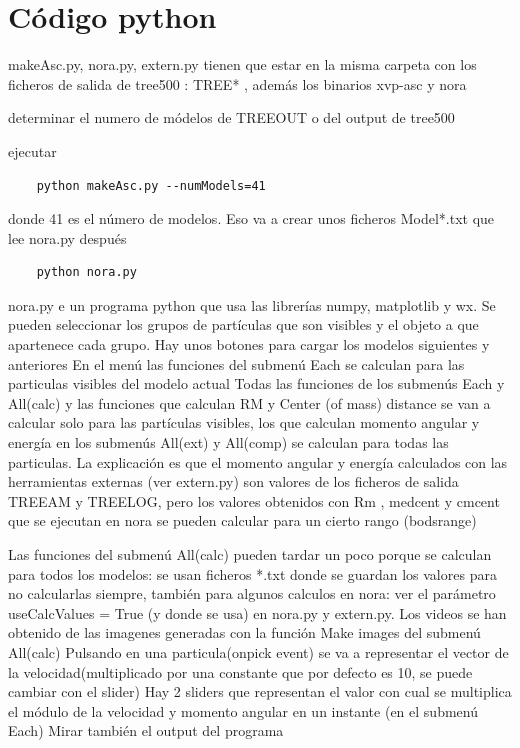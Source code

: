 \documentclass[12pt]{article} %
\renewcommand{\=}[1]{\stackrel{#1}{=}} %
\theoremstyle{definition}
\theoremstyle{remark}
\begin{document}
\section*{Código python}
\begin{description}
\item makeAsc.py, nora.py, extern.py tienen que estar en la misma carpeta con los ficheros de salida de tree500 : TREE* , además los binarios xvp-asc y nora
\item determinar el numero de módelos de TREEOUT o del output de tree500
\item ejecutar 
\begin{verbatim}
	python makeAsc.py --numModels=41
\end{verbatim}
\item donde 41 es el número de modelos. Eso va a crear unos ficheros Model*.txt  que lee nora.py después
\begin{verbatim}
	python nora.py
\end{verbatim}
\item nora.py e un programa python que usa las librerías numpy, matplotlib y wx.
Se pueden seleccionar los grupos de partículas que son visibles y el objeto a que apartenece cada grupo.
Hay unos botones para cargar los modelos siguientes y anteriores  
En el menú las funciones del submenú Each se calculan para las particulas visibles del modelo actual 
Todas las funciones de los submenús  Each y All(calc) y  las funciones que calculan RM y Center (of mass) distance se van a  calcular solo para las partículas visibles, los que calculan momento angular y energía en los submenús All(ext) y All(comp)  se calculan para todas las particulas. 
La explicación es que el momento angular y energía calculados con las herramientas externas (ver extern.py) son valores de los ficheros de salida TREEAM y TREELOG, pero los valores obtenidos con Rm , medcent y cmcent que se ejecutan en nora se pueden calcular para un cierto rango (bodsrange) 

Las funciones del submenú All(calc) pueden tardar un poco porque se calculan para todos los modelos: se usan ficheros *.txt donde se guardan los valores para no calcularlas siempre, también para algunos calculos en nora: ver el parámetro useCalcValues = True  (y donde se usa) en nora.py y extern.py. 
Los videos se han obtenido de las imagenes generadas con la función Make images del submenú All(calc)
Pulsando en una particula(onpick event) se va a representar el vector de la velocidad(multiplicado por una constante que por defecto es 10, se puede cambiar con el slider)
Hay 2 sliders que representan el valor con cual se multiplica el módulo de la velocidad y momento angular en un instante (en el submenú Each)
Mirar también el output del programa

\end{description}
\end{document}
